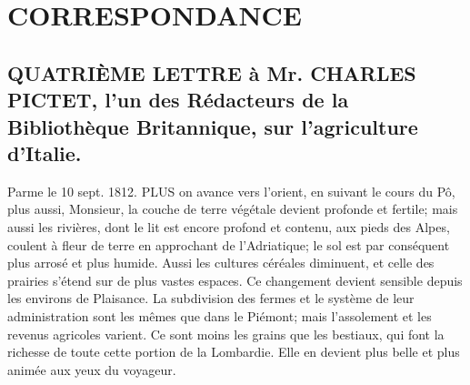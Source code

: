 \setcounter{page}{435}
\chapter{CORRESPONDANCE}
\section{QUATRIÈME LETTRE à Mr. CHARLES PICTET, l'un des Rédacteurs de la Bibliothèque Britannique, sur l'agriculture d'Italie.}
Parme le 10 sept. 1812.
PLUS on avance vers l'orient, en suivant le cours du Pô, plus aussi, Monsieur, la couche de terre végétale devient profonde et fertile; mais aussi les rivières, dont le lit est encore profond et contenu, aux pieds des Alpes, coulent à fleur de terre en approchant de l'Adriatique; le sol est par conséquent plus arrosé et plus humide. Aussi les cultures céréales diminuent, et celle des prairies s'étend sur de plus vastes espaces.
Ce changement devient sensible depuis les environs de Plaisance. La subdivision des fermes et le système de leur administration sont les mêmes que dans le Piémont; mais l'assolement et les revenus agricoles varient.
Ce sont moins les grains que les bestiaux, qui font la richesse de toute cette portion de la Lombardie. Elle en devient plus belle et plus animée aux yeux du voyageur.
